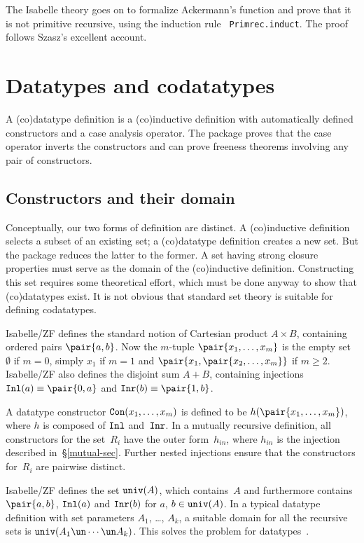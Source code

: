 The Isabelle theory goes on to formalize Ackermann's function and prove
that it is not primitive recursive, using the induction rule {\tt
  Primrec.induct}.  The proof follows Szasz's excellent account.


\section{Datatypes and codatatypes}\label{data-sec}
A (co)datatype definition is a (co)inductive definition with automatically
defined constructors and a case analysis operator.  The package proves that
the case operator inverts the constructors and can prove freeness theorems
involving any pair of constructors.


\subsection{Constructors and their domain}\label{univ-sec}
Conceptually, our two forms of definition are distinct.  A (co)inductive
definition selects a subset of an existing set; a (co)datatype definition
creates a new set.  But the package reduces the latter to the former.  A
set having strong closure properties must serve as the domain of the
(co)inductive definition.  Constructing this set requires some theoretical
effort, which must be done anyway to show that (co)datatypes exist.  It is
not obvious that standard set theory is suitable for defining codatatypes.

Isabelle/ZF defines the standard notion of Cartesian product $A\times B$,
containing ordered pairs $\pair{a,b}$.  Now the $m$-tuple
$\pair{x_1,\ldots,x_m}$ is the empty set~$\emptyset$ if $m=0$, simply
$x_1$ if $m=1$ and $\pair{x_1,\pair{x_2,\ldots,x_m}}$ if $m\geq2$.
Isabelle/ZF also defines the disjoint sum $A+B$, containing injections
$\Inl(a)\equiv\pair{0,a}$ and $\Inr(b)\equiv\pair{1,b}$.

A datatype constructor $\hbox{\tt Con}(x_1,\ldots,x_m)$ is defined to be
$h(\pair{x_1,\ldots,x_m})$, where $h$ is composed of $\hbox{\tt Inl}$ and~$\hbox{\tt Inr}$.
In a mutually recursive definition, all constructors for the set~$R_i$ have
the outer form~$h_{in}$, where $h_{in}$ is the injection described
in~\S\ref{mutual-sec}.  Further nested injections ensure that the
constructors for~$R_i$ are pairwise distinct.  

Isabelle/ZF defines the set $\hbox{\tt univ}(A)$, which contains~$A$ and
furthermore contains $\pair{a,b}$, $\hbox{\tt Inl}(a)$ and $\hbox{\tt Inr}(b)$ for $a$,
$b\in\hbox{\tt univ}(A)$.  In a typical datatype definition with set parameters
$A_1$, \ldots, $A_k$, a suitable domain for all the recursive sets is
$\univ(A_1\un\cdots\un A_k)$.  This solves the problem for
datatypes~\cite[\S4.2]{paulson-set-II}.

